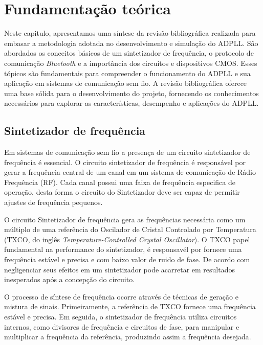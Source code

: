 \chapter{Fundamentação teórica}
Neste capitulo, apresentamos uma síntese da revisão bibliográfica realizada para embasar a metodologia adotada no desenvolvimento e simulação do ADPLL. São abordados os conceitos básicos de um sintetizador de frequência, o protocolo de comunicação \textit{Bluetooth} e a importância dos circuitos e dispositivos CMOS. Esses tópicos são fundamentais para compreender o funcionamento do ADPLL e sua aplicação em sistemas de comunicação sem fio. A revisão bibliográfica oferece uma base sólida para o desenvolvimento do projeto, fornecendo os conhecimentos necessários para explorar as características, desempenho e aplicações do ADPLL.

\section{Sintetizador de frequência}
Em sistemas de comunicação sem fio a presença de um circuito sintetizador de frequência é essencial. O circuito sintetizador de frequência é responsável por gerar a frequência central de um canal em um sistema de comunicação de Rádio Frequência (RF). Cada canal possui uma faixa de frequência especifica de operação, desta forma o circuito do Sintetizador deve ser capaz de permitir ajustes de frequência pequenos.

O circuito Sintetizador de frequência gera as frequências necessária como um múltiplo de uma referência do Oscilador de Cristal Controlado por Temperatura (TXCO, do inglês \textit{Temperature-Controlled Crystal Oscillator}). O TXCO papel fundamental na performance do sintetizador, é responsavél por fornece uma frequência estável e precisa e com baixo valor de ruido de fase. De acordo com \cite{lascari2000accurate} negligenciar seus efeitos em um sintetizador pode acarretar em resultados inesperados após a concepção do circuito.

O processo de síntese de frequência ocorre através de técnicas de geração e mistura de sinais. Primeiramente, a referência de TXCO fornece uma frequência estável e precisa. Em seguida, o sintetizador de frequência utiliza circuitos internos, como divisores de frequência e circuitos de fase, para manipular e multiplicar a frequência da referência, produzindo assim a frequência desejada.


